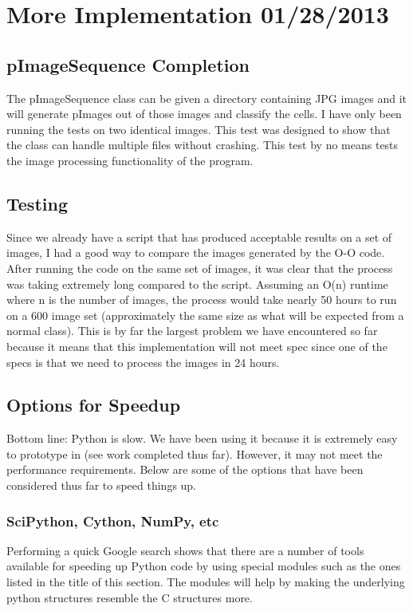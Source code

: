\documentclass[]{article}
\begin{document}
	
	\section{More Implementation 01/28/2013}
		
		\subsection{pImageSequence Completion}
			The pImageSequence class can be given a directory containing JPG images and it will generate pImages out of those images and classify the cells. I have only been running the tests on two identical images. This test was designed to show that the class can handle multiple files without crashing. This test by no means tests the image processing functionality of the program.
			
		\subsection{Testing}
			Since we already have a script that has produced acceptable results on a set of images, I had a good way to compare the images generated by the O-O code. After running the code on the same set of images, it was clear that the process was taking extremely long compared to the script. Assuming an O(n) runtime where n is the number of images, the process would take nearly 50 hours to run on a 600 image set (approximately the same size as what will be expected from a normal class). This is by far the largest problem we have encountered so far because it means that this implementation will not meet spec since one of the specs is that we need to process the images in 24 hours. 
			
		\subsection{Options for Speedup}
			Bottom line: Python is slow. We have been using it because it is extremely easy to prototype in (see work completed thus far). However, it may not meet the performance requirements. Below are some of the options that have been considered thus far to speed things up.
			
			\subsubsection{SciPython, Cython, NumPy, etc}
				Performing a quick Google search shows that there are a number of tools available for speeding up Python code by using special modules such as the ones listed in the title of this section. The modules will help by making the underlying python structures resemble the C structures more. 
				
\end{document}
